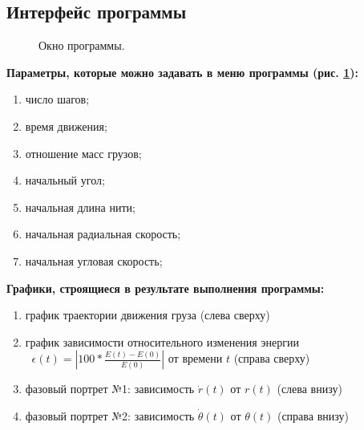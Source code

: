 \documentclass[12pt]{article}
\numberwithin{equation}{section}
\begin{document}
\subsection{Интерфейс программы}
\begin{figure}[h]
	\caption{Окно программы.}
    \label{menu}
\end{figure}

\textbf{Параметры, которые можно задавать в меню программы (рис. \ref{menu}):}
\begin{enumerate}
	\item число шагов;
	\item время движения;
	\item отношение масс грузов;
	\item начальный угол;
	\item начальная длина нити;
	\item начальная радиальная скорость;
	\item начальная угловая скорость;
\end{enumerate}
\textbf{Графики, строящиеся в результате выполнения программы:}
\begin{enumerate}
	\item график траектории движения груза (слева сверху)
	\item график зависимости относительного изменения энергии \\$ \;\;\epsilon(t)=|100*\frac{E(t)-E(0)}{E(0)}| $ от времени $ t $ (справа сверху)
	\item фазовый портрет №1: зависимость $ \dot r (t) $ от $ r (t) $ (слева внизу)
	\item фазовый портрет №2: зависимость $ \dot \theta (t) $ от $ \theta (t) $ (справа внизу)
\end{enumerate}
\end{document}
